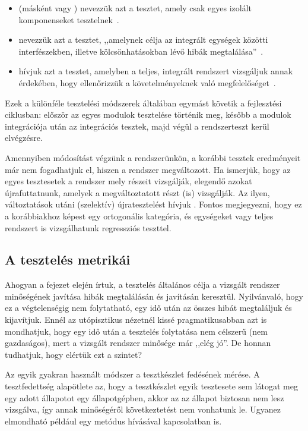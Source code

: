 \begin{itemize}
\item {} (másként  vagy ) nevezzük azt a tesztet, amely csak egyes izolált komponenseket tesztelnek~\cite{HTB-glossary}.
\item {} nevezzük azt a tesztet, ,,amelynek célja az integrált egységek közötti
interfészekben, illetve kölcsönhatásokban lévő hibák megtalálása''~\cite{HTB-glossary}.
\item {} hívjuk azt a tesztet, amelyben a teljes, integrált rendszert vizsgáljuk annak érdekében, hogy ellenőrizzük a követelményeknek való megfelelőséget~\cite{HTB-glossary}.
\end{itemize}

Ezek a különféle tesztelési módszerek általában egymást követik a fejlesztési ciklusban: először az egyes modulok tesztelése történik meg, később a modulok integrációja után az integrációs tesztek, majd végül a rendszerteszt kerül elvégzésre.

Amennyiben módosítást végzünk a rendszerünkön, a korábbi tesztek eredményeit már nem fogadhatjuk el, hiszen a rendszer megváltozott. Ha ismerjük, hogy az egyes tesztesetek a rendszer mely részeit vizsgálják, elegendő azokat újrafuttatnunk, amelyek a megváltoztatott részt (is) vizsgálják. Az ilyen, változtatások utáni (szelektív) újratesztelést hívjuk . Fontos megjegyezni, hogy ez a korábbiakhoz képest egy ortogonális kategória, és egységeket vagy teljes rendszert is vizsgálhatunk regressziós teszttel.

\subsection{A tesztelés metrikái}
Ahogyan a fejezet elején írtuk, a tesztelés általános célja a vizsgált rendszer minőségének javítása hibák megtalálásán és javításán keresztül. Nyilvánvaló, hogy ez a végtelenségig nem folytatható, egy idő után az összes hibát megtaláljuk és kijavítjuk. Ennél az utópisztikus nézetnél kissé pragmatikusabban azt is mondhatjuk, hogy egy idő után a tesztelés folytatása nem célszerű (nem gazdaságos), mert a vizsgált rendszer minősége már ,,elég jó''. %
De honnan tudhatjuk, hogy elértük ezt a szintet?

Az egyik gyakran használt módszer a tesztkészlet fedésének mérése. A tesztfedettség alapötlete az, hogy a tesztkészlet egyik tesztesete sem látogat meg egy adott állapotot egy állapotgépben, akkor az az állapot biztosan nem lesz vizsgálva, így annak minőségéről következtetést nem vonhatunk le. Ugyanez elmondható például egy metódus hívásával kapcsolatban is.

